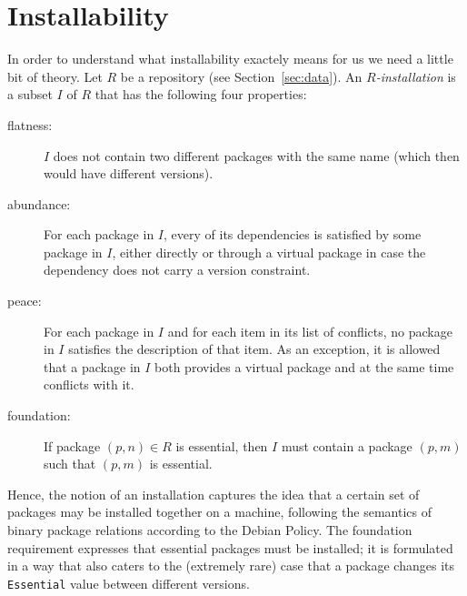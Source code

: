 
\section{Installability}
\label{sec:installability}

In order to understand what installability exactely means for us we need
a little bit of theory.
Let $R$ be a repository (see Section~\ref{sec:data}).  An
\emph{$R$-installation} is a subset $I$ of $R$ that has the following four
properties:
\begin{description}
  \item[flatness:] $I$ does not contain two different packages with the same
    name (which then would have different versions).
  \item[abundance:] For each package in $I$, every of its dependencies
    is satisfied by some package in $I$, either directly or through a
    virtual package in case the dependency does not carry a version
    constraint.
  \item[peace:] For each package in $I$ and for each item in its list
    of conflicts, no package in $I$ satisfies the description of that
    item.  As an exception, it is allowed that a package in $I$ both
    provides a virtual package and at the same time conflicts with it.
  \item[foundation:] If package $(p,n)\in R$ is essential, then $I$
    must contain a package $(p,m)$ such that $(p,m)$ is essential.
\end{description}
Hence, the notion of an installation captures the idea that a certain
set of packages may be installed together on a machine, following the
semantics of binary package relations according to the Debian Policy.
The foundation requirement expresses that essential packages must be
installed; it is formulated in a way that also caters to the
(extremely rare) case that a package changes its \texttt{Essential}
value between different versions.

